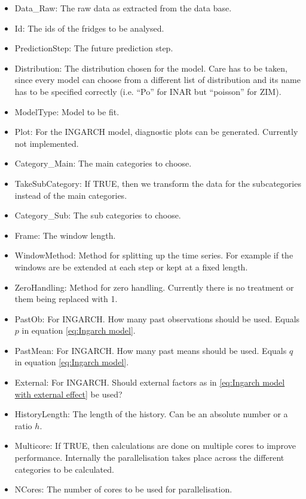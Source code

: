 \begin{itemize}
	\item Data\_Raw: The raw data as extracted from the data base.
  \item Id: The ids of the fridges to be analysed.
  \item PredictionStep: The future prediction step.
  \item Distribution: The distribution chosen for the model. Care has to be taken, since every model can choose from a different list of distribution and its name has to be specified correctly (i.e. "`Po"' for INAR but "`poisson"' for ZIM).
  \item ModelType: Model to be fit. 
  \item Plot: For the INGARCH model, diagnostic plots can be generated. Currently not implemented.
  \item Category\_Main: The main categories to choose. 
  \item TakeSubCategory: If TRUE, then we transform the data for the subcategories instead of the main categories. 
  \item Category\_Sub: The sub categories to choose.
  \item Frame: The window length.
  \item WindowMethod: Method for splitting up the time series. For example if the windows are be extended at each step or kept at a fixed length.
  \item ZeroHandling: Method for zero handling. Currently there is no treatment or them being replaced with 1. 
  \item PastOb: For INGARCH. How many past observations should be used. Equals $p$ in equation \ref{eq:Ingarch model}.
  \item PastMean: For INGARCH. How many past means should be used. Equals $q$ in equation \ref{eq:Ingarch model}.
  \item External: For INGARCH. Should external factors as in \ref{eq:Ingarch model with external effect} be used?
  \item HistoryLength: The length of the history. Can be an absolute number or a ratio $h$.
  \item Multicore: If TRUE, then calculations are done on multiple cores to improve performance. Internally the parallelisation takes place across the different categories to be calculated. 
  \item NCores: The number of cores to be used for parallelisation. 
\end{itemize}

